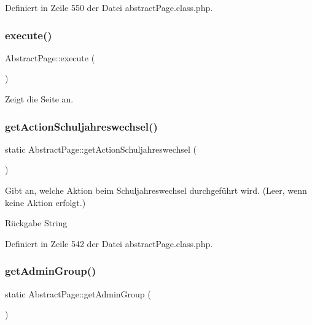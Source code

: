 Definiert in Zeile 550 der Datei abstract\+Page.\+class.\+php.

\mbox{\label{class_abstract_page_af8acacdd4a33f97087ef25a8771ecd9c}} 
\subsubsection{\texorpdfstring{execute()}{execute()}}
{\footnotesize\ttfamily Abstract\+Page\+::execute (\begin{DoxyParamCaption}{ }\end{DoxyParamCaption})\hspace{0.3cm}{\ttfamily [abstract]}}

Zeigt die Seite an. \mbox{\label{class_abstract_page_a489af76b365b0b30c3390eb602a4d85b}} 
\subsubsection{\texorpdfstring{get\+Action\+Schuljahreswechsel()}{getActionSchuljahreswechsel()}}
{\footnotesize\ttfamily static Abstract\+Page\+::get\+Action\+Schuljahreswechsel (\begin{DoxyParamCaption}{ }\end{DoxyParamCaption})\hspace{0.3cm}{\ttfamily [static]}}

Gibt an, welche Aktion beim Schuljahreswechsel durchgeführt wird. (Leer, wenn keine Aktion erfolgt.) \begin{DoxyReturn}{Rückgabe}
String 
\end{DoxyReturn}


Definiert in Zeile 542 der Datei abstract\+Page.\+class.\+php.

\mbox{\label{class_abstract_page_acda6df20abb2331922ea36b01c695fcd}} 
\subsubsection{\texorpdfstring{get\+Admin\+Group()}{getAdminGroup()}}
{\footnotesize\ttfamily static Abstract\+Page\+::get\+Admin\+Group (\begin{DoxyParamCaption}{ }\end{DoxyParamCaption})\hspace{0.3cm}{\ttfamily [static]}}

